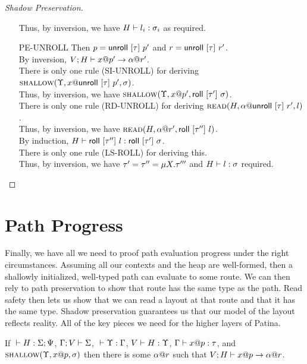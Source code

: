 \begin{proof}[Shadow Preservation]
\begin{itemize}
      Thus, by inversion, we have ${H} \vdash {l_i} : {\sigma_i}$ as required.
    \item[\textsc{PE-UNROLL}] 
      Then $p = \mathsf{unroll}~[{\tau}]~{p'}$ and $r = \mathsf{unroll}~[{\tau}]~{r'}$.\\
      By inversion, ${V;H} \vdash {{x}@{p'}} \to {{\alpha}@{r'}}$.\\
      There is only one rule (\textsc{SI-UNROLL}) for
      deriving $\textsc{shallow}({\Upsilon},{{x}@{\mathsf{unroll}~[{\tau}]~{p'}}},{\sigma})$.\\
      Thus, by inversion, we have $\textsc{shallow}({\Upsilon},{{x}@{p'}},{\mathsf{roll}~[{\tau'}]~{\sigma}})$.\\
      There is only one rule (\textsc{RD-UNROLL}) for
      deriving $\textsc{read}({H},{{\alpha}@{\mathsf{unroll}~[{\tau}]~{r'}}},{l})$.\\
      Thus, by inversion, we have $\textsc{read}({H},{{\alpha}@{r'}},{\mathsf{roll}~[{\tau''}]~{l}})$.\\
      By induction, ${H} \vdash {\mathsf{roll}~[{\tau''}]~{l}} : {\mathsf{roll}~[{\tau'}]~{\sigma}}$.\\
      There is only one rule (\textsc{LS-ROLL}) for deriving this.\\
      Thus, by inversion, we have $\tau' = \tau'' = \mu {X}.{\tau'''}$
      and ${H} \vdash {l} : {\sigma}$ required.
  \end{itemize}
\end{proof}

\section*{Path Progress}
Finally, we have all we need to proof path evaluation progress under the right circumstances.
Assuming all our contexts and the heap are well-formed,
then a shallowly initialized, well-typed path can evaluate to some route.
We can then rely to path preservation to show that route has the same type as the path.
Read safety then lets us show that we can read a layout at that route
and that it has the same type. Shadow preservation guarantees us that our
model of the layout reflects reality. All of the key pieces we need for
the higher layers of Patina.

\begin{lem}
  If ${} \vdash {H} : {\Sigma;\Psi}$, $\Gamma;V\vdash\Sigma$, ${} \vdash {\Upsilon} : {\Gamma}$, ${V} \vdash {H} : {\Upsilon}$,
  ${\Gamma} \vdash {{x}@{p}} : {\tau}$, and $\textsc{shallow}({\Upsilon},{{x}@{p}},{\sigma})$
  then there is some ${\alpha}@{r}$ such that ${V;H} \vdash {{x}@{p}} \to {{\alpha}@{r}}$.
\end{lem}

